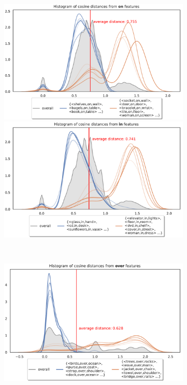 \begin{figure}
	\centering
	\begin{minipage}{0.5\textwidth}
		\centering
		\includegraphics[width=0.85\textwidth]{studies/sc2020/figures/on_variations_what.pdf}
	\end{minipage}%
	\begin{minipage}{0.5\textwidth}
		\centering
		\includegraphics[width=0.85\textwidth]{studies/sc2020/figures/in_variations_what.pdf}
	\end{minipage}\\
	\begin{minipage}{0.5\textwidth}
		\centering
		\includegraphics[width=0.85\textwidth]{studies/sc2020/figures/over_variations_what.pdf}

\end{minipage}
\end{figure}
